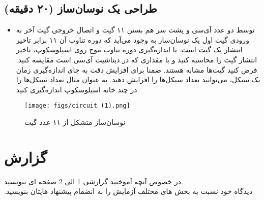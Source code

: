 \documentclass[12pt]{article}
\begin{document}
\subsection{طراحی یک نوسان‌ساز (۲۰ دقیقه)}
\begin{itemize}
    \item توسط دو عدد آی‌سی  و پشت سر هم بستن ۱۱ گیت  و اتصال خروجی گیت‌ آخر به ورودی گیت اول یک نوسان‌ساز به وجود می‌آید که دوره تناوب آن ۱۱ برابر تاخیر انتشار یک گیت است. با اندازه‌گیری دوره تناوب موج روی اسیلوسکوپ، تاخیر انتشار گیت را محاسبه کنید و با مقداری که در دیتاشیت آی‌سی است مقایسه کنید. فرض کنید گیت‌ها مشابه هستند. ضمنا برای افزایش دقت به جای اندازه‌گیری زمان یک سیکل، می‌توانید تعداد سیکل‌ها را افزایش دهید. به عنوان مثال تعداد سیکل‌ها را در چند خانه اسیلوسکوپ اندازه‌گیری کنید.
\end{itemize}
\begin{figure}[t]
    \centering
    \texttt{[image: figs/circuit (1).png]}
    \caption{نوسان‌ساز متشکل از ۱۱ عدد گیت }
    \label{fig:enter-label}
\end{figure}

\section{گزارش}
در خصوص آنچه آموختید گزارشی 1 الی 2 صفحه ای بنویسید.
‫\\
‫دیدگاه خود نسبت به بخش های مختلف آزمایش را به انضمام پیشنهاد هایتان بنویسید.
\end{document}
